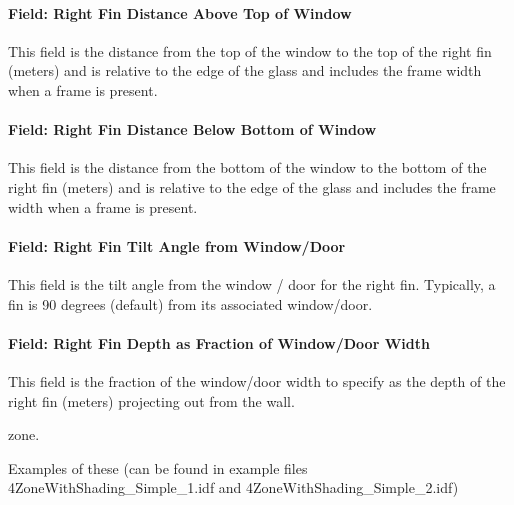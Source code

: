 \paragraph{Field: Right Fin Distance Above Top of Window}\label{field-right-fin-distance-above-top-of-window-1}

This field is the distance from the top of the window to the top of the right fin (meters) and is relative to the edge of the glass and includes the frame width when a frame is present.

\paragraph{Field: Right Fin Distance Below Bottom of Window}\label{field-right-fin-distance-below-bottom-of-window-1}

This field is the distance from the bottom of the window to the bottom of the right fin (meters) and is relative to the edge of the glass and includes the frame width when a frame is present.

\paragraph{Field: Right Fin Tilt Angle from Window/Door}\label{field-right-fin-tilt-angle-from-windowdoor-1}

This field is the tilt angle from the window / door for the right fin. Typically, a fin is 90 degrees (default) from its associated window/door.

\paragraph{Field: Right Fin Depth as Fraction of Window/Door Width}\label{field-right-fin-depth-as-fraction-of-windowdoor-width}

This field is the fraction of the window/door width to specify as the depth of the right fin (meters) projecting out from the wall.

zone.

Examples of these (can be found in example files 4ZoneWithShading\_Simple\_1.idf and 4ZoneWithShading\_Simple\_2.idf)

